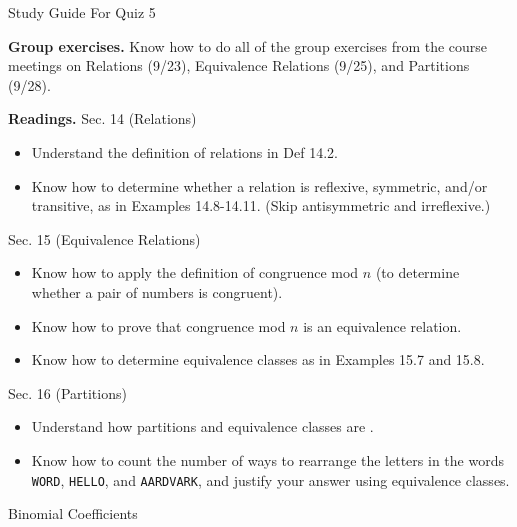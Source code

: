 \documentclass[10pt]{beamer}
\begin{document}
\begin{frame}{Study Guide For Quiz 5}
\footnotesize 

\colorbox{yellow!20}{\textbf{Group exercises.}} Know how to do all of the group exercises from the course meetings on Relations (9/23), Equivalence Relations (9/25), and Partitions (9/28).


\vfill 

\colorbox{red!20}{\textbf{Readings.}} 
Sec. 14 (Relations)
\begin{itemize}
\item Understand the definition of relations in Def 14.2.
\item Know how to determine whether a relation is reflexive, symmetric, and/or transitive, as in Examples 14.8-14.11.  (Skip antisymmetric and irreflexive.)
\end{itemize}
Sec. 15 (Equivalence Relations)
\begin{itemize}
\item Know how to apply the definition of congruence mod $n$ (to determine whether a pair of numbers is congruent).
\item Know how to prove that congruence mod $n$ is an equivalence relation.
\item Know how to determine equivalence classes as in Examples 15.7 and 15.8.
\end{itemize}
Sec. 16 (Partitions)
\begin{itemize}
\item Understand how partitions and equivalence classes are .
\item Know how to count the number of ways to rearrange the letters in the words \texttt{WORD}, \texttt{HELLO}, and \texttt{AARDVARK}, and justify your answer using equivalence classes.
\end{itemize}

\end{frame}


\begin{frame}[standout]
Binomial Coefficients	
\end{frame}
\end{document}
